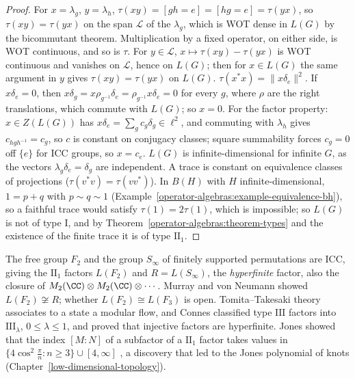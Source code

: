 \begin{proof}
For $x = \lambda_g$, $y = \lambda_h$, $\tau(xy) = [gh = e] = [hg = e] = \tau(yx)$, so $\tau(xy) = \tau(yx)$ on the span $\mathcal{L}$ of the $\lambda_g$, which is WOT dense in $L(G)$ by the bicommutant theorem. Multiplication by
a fixed operator, on either side, is WOT continuous, and so is $\tau$. For $y \in \mathcal{L}$, $x \mapsto \tau(xy) - \tau(yx)$ is WOT continuous and vanishes on $\mathcal{L}$, hence on $L(G)$; then for $x \in L(G)$ the same
argument in $y$ gives $\tau(xy) = \tau(yx)$ on $L(G)$. $\tau(x^*x) = \|x\delta_e\|^2$. If $x\delta_e = 0$, then $x\delta_g = x\rho_{g^{-1}}\delta_e = \rho_{g^{-1}}x\delta_e = 0$ for every $g$, where $\rho$ are the right
translations, which commute with $L(G)$; so $x = 0$. For the factor property: $x \in Z(L(G))$ has $x\delta_e = \sum_gc_g\delta_g \in \ell^2$, and commuting with $\lambda_h$ gives $c_{hgh^{-1}} = c_g$, so $c$ is constant on conjugacy
classes; square summability forces $c_g = 0$ off $\{e\}$ for ICC groups, so $x = c_e$. $L(G)$ is infinite-dimensional for infinite $G$, as the vectors $\lambda_g\delta_e = \delta_g$ are independent. A trace is constant on equivalence classes of projections ($\tau(v^*v) = \tau(vv^*)$). In $B(H)$ with $H$
infinite-dimensional, $1 = p + q$ with $p \sim q \sim 1$ (Example~\ref{operator-algebras:example-equivalence-bh}), so a faithful trace would satisfy $\tau(1) = 2\tau(1)$, which is impossible; so $L(G)$ is not of type
$\mathrm{I}$, and by Theorem~\ref{operator-algebras:theorem-types} and the existence of the finite trace it is of type $\mathrm{II}_1$.
\end{proof}

\begin{remark}\label{operator-algebras:remark-factors}
The free group $F_2$ and the group $S_\infty$ of finitely supported permutations are ICC, giving the $\mathrm{II}_1$ factors $L(F_2)$ and $R = L(S_\infty)$, the \emph{hyperfinite} factor, also the closure of
$M_2(\CC) \otimes M_2(\CC) \otimes \cdots$. Murray and von Neumann showed $L(F_2) \not\cong R$; whether $L(F_2) \cong L(F_3)$ is open. Tomita--Takesaki theory associates to a state a modular flow, and Connes classified
type $\mathrm{III}$ factors into $\mathrm{III}_\lambda$, $0 \leq \lambda \leq 1$, and proved that injective factors are hyperfinite. Jones showed that the index $[M : N]$ of a subfactor of a $\mathrm{II}_1$ factor takes values in
$\{4\cos^2\frac\pi n : n \geq 3\} \cup [4, \infty]$ \cite{jones-1983}, a discovery that led to the Jones polynomial of knots (Chapter~\ref{low-dimensional-topology}).
\end{remark}

